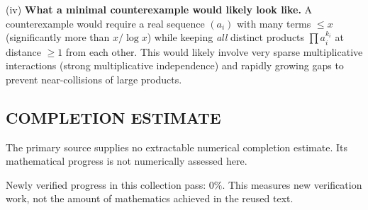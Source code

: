 (iv) \textbf{What a minimal counterexample would likely look like.}
A counterexample would require a real sequence $(a_i)$ with many terms $\le x$ (significantly more than $x/\log x$) while keeping \emph{all} distinct products $\prod a_i^{k_i}$ at distance $\ge1$ from each other. This would likely involve very sparse multiplicative interactions (strong multiplicative independence) and rapidly growing gaps to prevent near-collisions of large products.




\subsection*{COMPLETION ESTIMATE}
The primary source supplies no extractable numerical completion estimate. Its mathematical progress is not numerically assessed here.

Newly verified progress in this collection pass: $0\%$. This measures new verification work, not the amount of mathematics achieved in the reused text.
